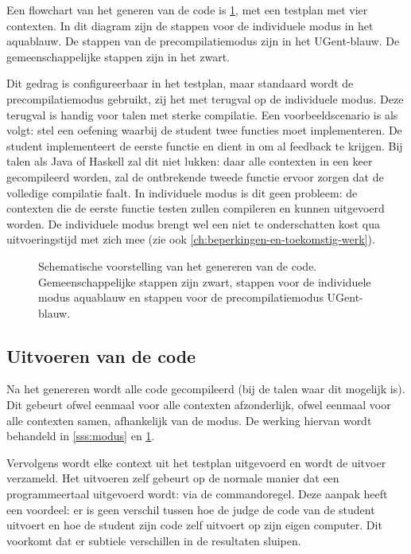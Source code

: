 Een flowchart van het generen van de code is \cref{fig:generation}, met een testplan met vier contexten.
In dit diagram zijn de stappen voor de individuele modus in het \textcolor{ugent-we}{aquablauw}.
De stappen van de precompilatiemodus zijn in het \textcolor{ugent-blue}{UGent-blauw}.
De gemeenschappelijke stappen zijn in het zwart.

Dit gedrag is configureerbaar in het testplan, maar standaard wordt de precompilatiemodus gebruikt, zij het met terugval op de individuele modus.
Deze terugval is handig voor talen met sterke compilatie.
Een voorbeeldscenario is als volgt: stel een oefening waarbij de student twee functies moet implementeren.
De student implementeert de eerste functie en dient in om al feedback te krijgen.
Bij talen als Java of Haskell zal dit niet lukken: daar alle contexten in een keer gecompileerd worden, zal de ontbrekende tweede functie ervoor zorgen dat de volledige compilatie faalt.
In individuele modus is dit geen probleem: de contexten die de eerste functie testen zullen compileren en kunnen uitgevoerd worden.
De individuele modus brengt wel een niet te onderschatten kost qua uitvoeringstijd met zich mee (zie ook \cref{ch:beperkingen-en-toekomstig-werk}).

\begin{figure}
    \begin{adjustbox}{width=\textwidth}
        
    \end{adjustbox}
    \caption{
        Schematische voorstelling van het genereren van de code.
        Gemeenschappelijke stappen zijn zwart, stappen voor de individuele modus \textcolor{ugent-we}{aquablauw} en stappen voor de precompilatiemodus \textcolor{ugent-blue}{UGent-blauw}.
    }
    \label{fig:generation}
\end{figure}

\subsection{Uitvoeren van de code}\label{subsec:uitvoeren-van-de-code}

Na het genereren wordt alle code gecompileerd (bij de talen waar dit mogelijk is).
Dit gebeurt ofwel eenmaal voor alle contexten afzonderlijk, ofwel eenmaal voor alle contexten samen, afhankelijk van de modus.
De werking hiervan wordt behandeld in \cref{sss:modus} en \cref{fig:generation}.

Vervolgens wordt elke context uit het testplan uitgevoerd en wordt de uitvoer verzameld.
Het uitvoeren zelf gebeurt op de normale manier dat een programmeertaal uitgevoerd wordt: via de commandoregel.
Deze aanpak heeft een voordeel: er is geen verschil tussen hoe de judge de code van de student uitvoert en hoe de student zijn code zelf uitvoert op zijn eigen computer.
Dit voorkomt dat er subtiele verschillen in de resultaten sluipen.

